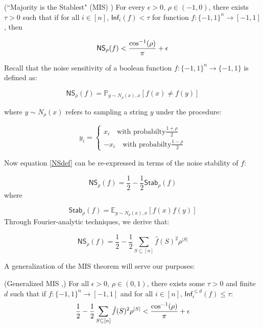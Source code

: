 \begin{theorem} (``Majority is the Stablest" (MIS) \cite{mossel2005noise})
For every $\epsilon > 0$, $\rho \in (-1,0)$, there exists $\tau > 0$ such that if for all $i \in [n]$, $\mathsf{Inf}_i(f) < \tau$ for function $f:\{-1,1\}^n \rightarrow [-1,1]$, then

\begin{equation}
  \mathsf{NS}_{\rho}(f) < \frac{\cos^{-1}(\rho)}{\pi} + \epsilon
\end{equation}
\end{theorem}

Recall that the noise sensitivity of a boolean function $f:\{-1,1\}^n \rightarrow \{-1,1\}$ is defined as:

\begin{equation} \label{NSdef}
  \mathsf{NS}_\rho(f)  = \mathbb{P}_{y \sim N_{\rho}(x), x} [f(x) \neq f(y)]
\end{equation}

where $y \sim N_\rho(x)$ refers to sampling a string $y$ under the procedure:

\begin{equation*}
  y_i = \begin{cases}
        x_i \quad \text{with probabilty} \frac{1 + \rho}{2} \\
        -x_i \quad \text{with probabilty} \frac{1 - \rho}{2}
        \end{cases}
\end{equation*}
\newline

Now equation \ref{NSdef} can be re-expressed in terms of the noise stability of $f$:

\begin{equation}
  \mathsf{NS}_\rho(f) = \frac{1}{2} - \frac{1}{2}\mathsf{Stab}_\rho(f)
\end{equation}
where

\begin{equation*}
  \mathsf{Stab}_\rho(f) = \mathbb{E}_{y \sim N_{\rho}(x), x}[f(x)f(y)]
\end{equation*}
Through Fourier-analytic techniques, we derive that:

\begin{equation}
  \mathsf{NS}_\rho(f) = \frac{1}{2} - \frac{1}{2}\sum_{S\subseteq [n]}\hat{f}(S)^2\rho^{|S|}
\end{equation}

A generalization of the MIS theorem will serve our purposes:

\begin{theorem} \label{generalMIS} (Generalized MIS \cite{khot2007optimal},\cite{mossel2005noise})
  For all $\epsilon > 0$, $\rho \in (0,1)$, there exists some $\tau > 0$ and finite $d$ such that if $f:\{-1,1\}^n \rightarrow [-1,1]$ and for all $i \in [n]$, $\mathsf{Inf}^{\leq d}_i(f) \leq \tau$:
  \begin{equation}
    \frac{1}{2} - \frac{1}{2}\sum_{S\subseteq [n]}\hat{f}(S)^2\rho^{|S|} < \frac{\cos^{-1}(\rho)}{\pi} + \epsilon
  \end{equation}
\end{theorem}

